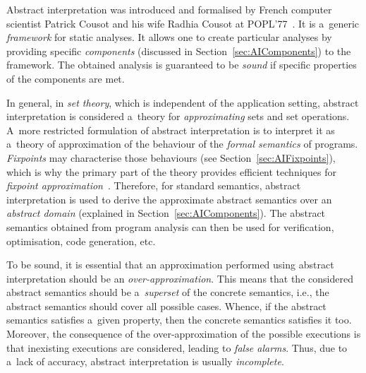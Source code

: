 Abstract interpretation was introduced and formalised by French computer scientist Patrick Cousot and his wife Radhia Cousot at POPL'77~\cite{AILatticeModelCousot}. It is a~generic \emph{framework} for static analyses. It allows one to create particular analyses by providing specific \emph{components} (discussed in Section~\ref{sec:AIComponents}) to the framework. The obtained analysis is guaranteed to be \emph{sound} if specific properties of the components are met.

In general, in \emph{set theory}, which is independent of the application setting, abstract interpretation is considered a~theory for \emph{approximating} sets and set operations. A~more restricted formulation of abstract interpretation is to interpret it as a~theory of approximation of the behaviour of the \emph{formal semantics} of programs. \emph{Fixpoints} may characterise those behaviours (see Section~\ref{sec:AIFixpoints}), which is why the primary part of the theory provides efficient techniques for \emph{fixpoint approximation}~\cite{programAnalysisNielson}. Therefore, for standard semantics, abstract interpretation is used to derive the approximate abstract semantics over an \emph{abstract domain} (explained in Section~\ref{sec:AIComponents}). The abstract semantics obtained from program analysis can then be used for verification, optimisation, code generation, etc.~\cite{AIBasedFormalMethodsCousot}

To be sound, it is essential that an approximation performed using abstract interpretation should be an \emph{over-approximation}. This means that the considered abstract semantics should be a~\emph{superset} of the concrete semantics, i.e., the abstract semantics should cover all possible cases. Whence, if the abstract semantics satisfies a~given property, then the concrete semantics satisfies it too. Moreover, the consequence of the over-approximation of the possible executions is that inexisting executions are considered, leading to \emph{false alarms}. Thus, due to a~lack of accuracy, abstract interpretation is usually \emph{incomplete}.~\cite{AIInNutshellCousot}


